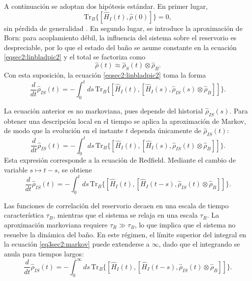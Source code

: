 A continuación se adoptan dos hipótesis estándar. En primer lugar,
\[
\text{Tr}_{B}\{[\hat{H}_{I}(t), \hat{\rho}(0)] \}=0,
\]
sin pérdida de generalidad \cite{breuer2002theory}. En segundo lugar, se introduce la aproximación de Born: para acoplamiento débil, la influencia del sistema sobre el reservorio es despreciable, por lo que el estado del baño se asume constante en la ecuación \eqref{eqsec2:linbladpic2} y el total se factoriza como
\begin{equation*}
    \hat{\rho}(t) \approx \hat{\rho}_{S}(t)\otimes \hat{\rho}_{B}.
\end{equation*}
Con esta suposición, la ecuación \eqref{eqsec2:linbladpic2} toma la forma
\begin{equation}
    \frac{d}{dt}\hat{\rho}_{IS}(t) = - \int_{0}^{t} ds \,\text{Tr}_{B}\{[\hat{H}_{I}(t), [\hat{H}_{I}(s), \hat{\rho}_{IS}(s) \otimes \hat{\rho}_{B}]]\}.
\end{equation}

La ecuación anterior es no markoviana, pues depende del historial $\hat{\rho}_{IS}(s)$. Para obtener una descripción local en el tiempo se aplica la aproximación de Markov, de modo que la evolución en el instante $t$ dependa únicamente de $\hat{\rho}_{IS}(t)$:
\begin{equation*}
    \frac{d}{dt}\hat{\rho}_{IS}(t) = - \int_{0}^{t} ds \,\text{Tr}_{B}\{[\hat{H}_{I}(t), [\hat{H}_{I}(s), \hat{\rho}_{IS}(t) \otimes \hat{\rho}_{B}]]\}.
\end{equation*}
Esta expresión corresponde a la ecuación de Redfield. Mediante el cambio de variable $s \mapsto t-s$, se obtiene
\begin{equation}
    \frac{d}{dt}\hat{\rho}_{IS}(t) = - \int_{0}^{t} ds \,\text{Tr}_{B}\{[\hat{H}_{I}(t), [\hat{H}_{I}(t-s), \hat{\rho}_{IS}(t) \otimes \hat{\rho}_{B}]]\}.
    \label{eq3sec2:markov}
\end{equation}

Las funciones de correlación del reservorio decaen en una escala de tiempo característica $\tau_{B}$, mientras que el sistema se relaja en una escala $\tau_{R}$. La aproximación markoviana requiere $\tau_{R}\gg \tau_{B}$, lo que implica que el sistema no resuelve la dinámica del baño. En este régimen, el límite superior del integral en la ecuación \eqref{eq3sec2:markov} puede extenderse a $\infty$, dado que el integrando se anula para tiempos largos:
\begin{equation}
    \frac{d}{dt}\hat{\rho}_{IS}(t) = - \int_{0}^{\infty} ds \,\text{Tr}_{B}\{[\hat{H}_{I}(t), [\hat{H}_{I}(t-s), \hat{\rho}_{IS}(t) \otimes \hat{\rho}_{B}]]\}.
    \label{eq3sec2:markov1}
\end{equation}

